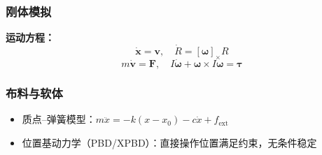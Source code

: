 \subsubsection{刚体模拟}

\textbf{运动方程：}
\[
\dot{\mathbf{x}} = \mathbf{v}, \quad \dot{R} = [\boldsymbol{\omega}]_\times R
\]
\[
m\dot{\mathbf{v}} = \mathbf{F}, \quad I\dot{\boldsymbol{\omega}} + \boldsymbol{\omega} \times I\boldsymbol{\omega} = \boldsymbol{\tau}
\]

\subsubsection{布料与软体}

\begin{itemize}
  \item 质点--弹簧模型：$m\ddot{x} = -k(x - x_0) - c\dot{x} + f_{\text{ext}}$
  \item 位置基动力学（PBD/XPBD）：直接操作位置满足约束，无条件稳定
\end{itemize}